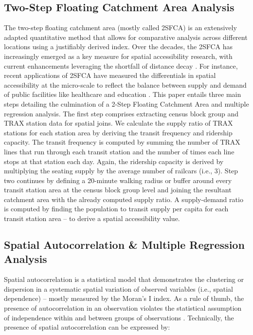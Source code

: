 \documentclass[numbered]{trbunofficial}
\begin{document}
\subsection{Two-Step Floating Catchment Area Analysis}
The two-step floating catchment area (mostly called 2SFCA) is an extensively adapted quantitative method that allows for comparative analysis across different locations using a justifiably derived index. Over the decades, the 2SFCA has increasingly emerged as a key measure for spatial accessibility research, with current enhancements leveraging the shortfall of distance decay \cite{KC2020,Langford2016,McGrail2012,Luo2009}. For instance, recent applications of 2SFCA have measured the differentials in spatial accessibility at the micro-scale to reflect the balance between supply and demand of public facilities like healthcare and education \cite{Li2022,Wu2020}. This paper entails three main steps detailing the culmination of a 2-Step Floating Catchment Area and multiple regression analysis. The first step comprises extracting census block group and TRAX station data for spatial joins. We calculate the supply ratio of TRAX stations for each station area by deriving the transit frequency and ridership capacity. The transit frequency is computed by summing the number of TRAX lines that run through each transit station and the number of times each line stops at that station each day. Again, the ridership capacity is derived by multiplying the seating supply by the average number of railcars (i.e., 3). Step two continues by defining a 20-minute walking radius or buffer around every transit station area at the census block group level and joining the resultant catchment area with the already computed supply ratio. A supply-demand ratio is computed by finding the population to transit supply per capita for each transit station area – to derive a spatial accessibility value.

\subsection{Spatial Autocorrelation \& Multiple Regression Analysis}
Spatial autocorrelation is a statistical model that demonstrates the clustering or dispersion in a systematic spatial variation of observed variables (i.e., spatial dependence) – mostly measured by the Moran’s I index. As a rule of thumb, the presence of autocorrelation in an observation violates the statistical assumption of independence within and between groups of observations \cite{Freitas2022,Mahrous2022,Fischer2011}. Technically, the presence of spatial autocorrelation can be expressed by:
\end{document}
